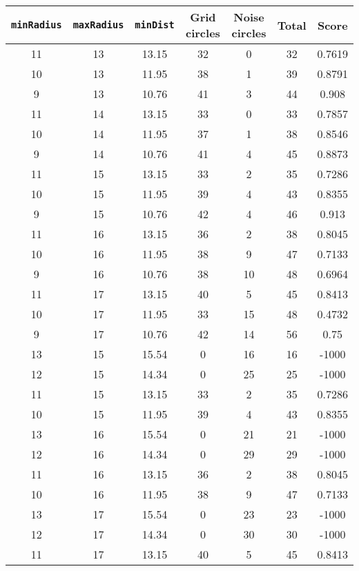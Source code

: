 \documentclass[letterpaper, 12pt]{article}
\begin{document}
\begin{longtable}{|c|c|c|c|c|c|c|}
\hline
\textbf{\texttt{minRadius}} & \textbf{\texttt{maxRadius}} & \textbf{\texttt{minDist}} & \textbf{Grid circles} & \textbf{Noise circles} & \textbf{Total} & \textbf{Score} \\
\hline
11 & 13 & 13.15 & 32 & 0 & 32 & 0.7619 \\
\hline
10 & 13 & 11.95 & 38 & 1 & 39 & 0.8791 \\
\hline
9 & 13 & 10.76 & 41 & 3 & 44 & 0.908 \\
\hline
11 & 14 & 13.15 & 33 & 0 & 33 & 0.7857 \\
\hline
10 & 14 & 11.95 & 37 & 1 & 38 & 0.8546 \\
\hline
9 & 14 & 10.76 & 41 & 4 & 45 & 0.8873 \\
\hline
11 & 15 & 13.15 & 33 & 2 & 35 & 0.7286 \\
\hline
10 & 15 & 11.95 & 39 & 4 & 43 & 0.8355 \\
\hline
9 & 15 & 10.76 & 42 & 4 & 46 & 0.913 \\
\hline
11 & 16 & 13.15 & 36 & 2 & 38 & 0.8045 \\
\hline
10 & 16 & 11.95 & 38 & 9 & 47 & 0.7133 \\
\hline
9 & 16 & 10.76 & 38 & 10 & 48 & 0.6964 \\
\hline
11 & 17 & 13.15 & 40 & 5 & 45 & 0.8413 \\
\hline
10 & 17 & 11.95 & 33 & 15 & 48 & 0.4732 \\
\hline
9 & 17 & 10.76 & 42 & 14 & 56 & 0.75 \\
\hline
13 & 15 & 15.54 & 0 & 16 & 16 & -1000 \\
\hline
12 & 15 & 14.34 & 0 & 25 & 25 & -1000 \\
\hline
11 & 15 & 13.15 & 33 & 2 & 35 & 0.7286 \\
\hline
10 & 15 & 11.95 & 39 & 4 & 43 & 0.8355 \\
\hline
13 & 16 & 15.54 & 0 & 21 & 21 & -1000 \\
\hline
12 & 16 & 14.34 & 0 & 29 & 29 & -1000 \\
\hline
11 & 16 & 13.15 & 36 & 2 & 38 & 0.8045 \\
\hline
10 & 16 & 11.95 & 38 & 9 & 47 & 0.7133 \\
\hline
13 & 17 & 15.54 & 0 & 23 & 23 & -1000 \\
\hline
12 & 17 & 14.34 & 0 & 30 & 30 & -1000 \\
\hline
11 & 17 & 13.15 & 40 & 5 & 45 & 0.8413 \\
\hline

\end{longtable}
\end{document}
